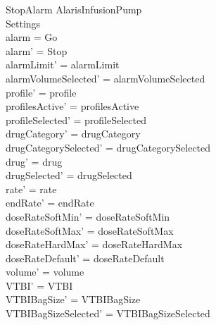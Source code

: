 \begin{schema}{StopAlarm}
	\Delta AlarisInfusionPump\\
	\pagebreak
	Settings\\
	\where
	alarm = Go\\
	alarm' = Stop\\
	alarmLimit' = alarmLimit\\
	alarmVolumeSelected' = alarmVolumeSelected\\
	profile' = profile\\
	profilesActive' = profilesActive\\  
	  profileSelected' = profileSelected\\
	drugCategory' = drugCategory\\ drugCategorySelected' = drugCategorySelected\\
	drug' = drug\\ drugSelected' = drugSelected\\
	rate' = rate\\
	endRate' = endRate\\
	doseRateSoftMin' = doseRateSoftMin\\
	doseRateSoftMax' = doseRateSoftMax\\
	doseRateHardMax' = doseRateHardMax\\
	doseRateDefault' = doseRateDefault\\
	volume' = volume\\
	VTBI' = VTBI\\
	VTBIBagSize' = VTBIBagSize\\ VTBIBagSizeSelected' = VTBIBagSizeSelected\\

\end{schema}
